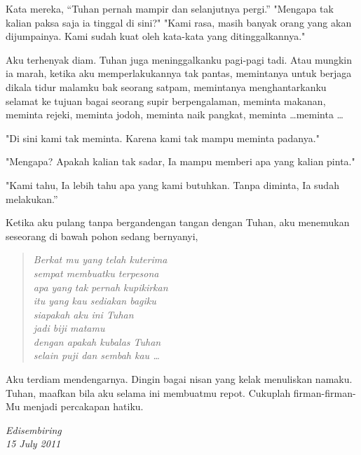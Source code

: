 Kata mereka, “Tuhan pernah mampir dan selanjutnya pergi.”
"Mengapa tak kalian paksa saja ia tinggal di sini?"
"Kami rasa, masih banyak orang yang akan dijumpainya. Kami sudah kuat oleh kata-kata yang ditinggalkannya."

Aku terhenyak diam. Tuhan juga meninggalkanku pagi-pagi tadi.
Atau mungkin ia marah, ketika aku memperlakukannya tak pantas, memintanya untuk berjaga dikala tidur malamku bak seorang satpam, memintanya menghantarkanku selamat ke tujuan bagai seorang supir berpengalaman, meminta makanan, meminta rejeki, meminta jodoh, meminta naik pangkat, meminta \ldots meminta \ldots

"Di sini kami tak meminta. Karena kami tak mampu meminta padanya."

"Mengapa? Apakah kalian tak sadar, Ia mampu memberi apa yang kalian pinta."

"Kami tahu, Ia lebih tahu apa yang kami butuhkan. Tanpa diminta, Ia sudah melakukan.”

Ketika aku pulang tanpa bergandengan tangan dengan Tuhan, aku menemukan seseorang di bawah pohon sedang bernyanyi,

\begin{quote}
\textit{Berkat mu yang telah kuterima\\sempat membuatku terpesona\\
apa yang tak pernah kupikirkan\\itu yang kau sediakan bagiku\\siapakah aku ini Tuhan\\ jadi biji matamu\\dengan apakah kubalas Tuhan\\selain puji dan sembah kau \dots}
\end{quote}

Aku terdiam mendengarnya. Dingin bagai nisan yang kelak menuliskan namaku. Tuhan, maafkan bila aku selama ini membuatmu repot. Cukuplah firman-firman-Mu menjadi percakapan hatiku.

\begin{flushright}
\textit{Edisembiring\\15 July 2011}
\end{flushright}